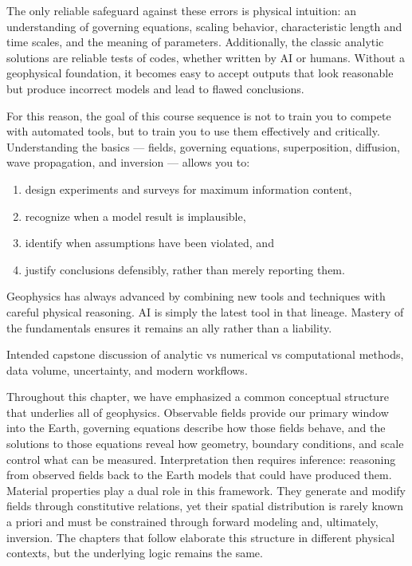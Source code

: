 The only reliable safeguard against these errors is physical intuition: an understanding of governing equations, scaling behavior, characteristic length and time scales, and the meaning of parameters. Additionally, the classic analytic solutions are reliable tests of codes, whether written by AI or humans.  Without a geophysical foundation, it becomes easy to accept outputs that look reasonable but produce incorrect models and lead to flawed conclusions.

For this reason, the goal of this course sequence is not to train you to compete with automated tools, but to train you to use them effectively and critically. Understanding the basics — fields, governing equations, superposition, diffusion, wave propagation, and inversion — allows you to:
\begin{enumerate}
    \item design experiments and surveys for maximum information content,
    \item recognize when a model result is implausible,
    \item identify when assumptions have been violated, and
    \item justify conclusions defensibly, rather than merely reporting them.
\end{enumerate}

Geophysics has always advanced by combining new tools and techniques with careful physical reasoning. AI is simply the latest tool in that lineage. Mastery of the fundamentals ensures it remains an ally rather than a liability.

Intended capstone discussion of analytic vs numerical vs computational methods, data volume, uncertainty, and modern workflows.

Throughout this chapter, we have emphasized a common conceptual structure that underlies all of geophysics. Observable fields provide our primary window into the Earth, governing equations describe how those fields behave, and the solutions to those equations reveal how geometry, boundary conditions, and scale control what can be measured. Interpretation then requires inference: reasoning from observed fields back to the Earth models that could have produced them. Material properties play a dual role in this framework. They generate and modify fields through constitutive relations, yet their spatial distribution is rarely known a priori and must be constrained through forward modeling and, ultimately, inversion. The chapters that follow elaborate this structure in different physical contexts, but the underlying logic remains the same.

